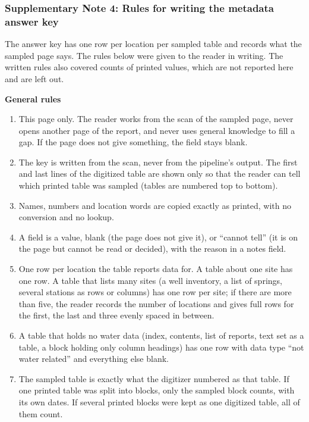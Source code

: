 \subsubsection*{Supplementary Note 4: Rules for writing the metadata answer key}

The answer key has one row per location per sampled table and records what the sampled page says. The rules below were given to the reader in writing. The written rules also covered counts of printed values, which are not reported here and are left out.

\textbf{General rules}

\begin{enumerate}
  \item This page only. The reader works from the scan of the sampled page, never opens another page of the report, and never uses general knowledge to fill a gap. If the page does not give something, the field stays blank.
  \item The key is written from the scan, never from the pipeline's output. The first and last lines of the digitized table are shown only so that the reader can tell which printed table was sampled (tables are numbered top to bottom).
  \item Names, numbers and location words are copied exactly as printed, with no conversion and no lookup.
  \item A field is a value, blank (the page does not give it), or ``cannot tell'' (it is on the page but cannot be read or decided), with the reason in a notes field.
  \item One row per location the table reports data for. A table about one site has one row. A table that lists many sites (a well inventory, a list of springs, several stations as rows or columns) has one row per site; if there are more than five, the reader records the number of locations and gives full rows for the first, the last and three evenly spaced in between.
  \item A table that holds no water data (index, contents, list of reports, text set as a table, a block holding only column headings) has one row with data type ``not water related'' and everything else blank.
  \item The sampled table is exactly what the digitizer numbered as that table. If one printed table was split into blocks, only the sampled block counts, with its own dates. If several printed blocks were kept as one digitized table, all of them count.
\end{enumerate}

